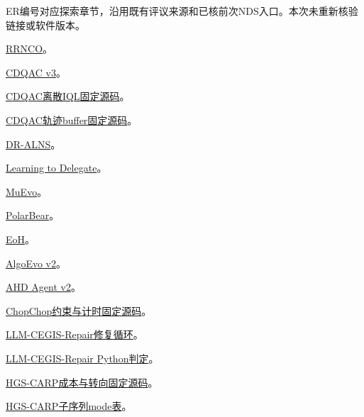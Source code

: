 \documentclass[11pt,a4paper]{article}
\newcommand{\bodytext}[1]{#1\par}
\newcommand{\referencetext}[1]{{\fontsize{9.4}{14.2}\selectfont#1\par}}
\begin{document}
\bodytext{ER编号对应探索章节，沿用既有评议来源和已核前次NDS入口。本次未重新核验链接或软件版本。}
\referencetext{[ER01] \href{https://arxiv.org/html/2503.16159v1}{RRNCO}。}
\referencetext{[ER02] \href{https://arxiv.org/html/2509.10303v3}{CDQAC v3}。}
\referencetext{[ER03] \href{https://github.com/jesserem/CDQAC\_scheduling/blob/aca0896aae7b715606b8f47e870e4489e50ebf5c/cdqac/methods/iql.py}{CDQAC离散IQL固定源码}。}
\referencetext{[ER04] \href{https://github.com/jesserem/CDQAC\_scheduling/blob/aca0896aae7b715606b8f47e870e4489e50ebf5c/cdqac/buffer/buffer.py\#L138-L173}{CDQAC轨迹buffer固定源码}。}
\referencetext{[ER05] \href{https://arxiv.org/abs/2211.00759}{DR-ALNS}。}
\referencetext{[ER06] \href{https://papers.neurips.cc/paper\_files/paper/2021/hash/dc9fa5f217a1e57b8a6adeb065560b38-Abstract.html}{Learning to Delegate}。}
\referencetext{[ER07] \href{https://arxiv.org/html/2608.03636v1}{MuEvo}。}
\referencetext{[ER08] \href{https://arxiv.org/html/2603.08493v1}{PolarBear}。}
\referencetext{[ER09] \href{https://proceedings.mlr.press/v235/liu24bs.html}{EoH}。}
\referencetext{[ER10] \href{https://arxiv.org/html/2609.15820v2}{AlgoEvo v2}。}
\referencetext{[ER11] \href{https://arxiv.org/html/2605.08756v2}{AHD Agent v2}。}
\referencetext{[ER12] \href{https://github.com/large-loris-models/chopchop/blob/681083a6fd921ac9cbaf984db628cf92eb019a3f/llm/run\_llm.py}{ChopChop约束与计时固定源码}。}
\referencetext{[ER13] \href{https://github.com/pmorvalho/LLM-CEGIS-Repair/blob/7fe749b16a7a1367f2a519492a5d8689af06a896/repair.py}{LLM-CEGIS-Repair修复循环}。}
\referencetext{[ER14] \href{https://github.com/pmorvalho/LLM-CEGIS-Repair/blob/7fe749b16a7a1367f2a519492a5d8689af06a896/mentor/interpreter.py}{LLM-CEGIS-Repair Python判定}。}
\referencetext{[ER15] \href{https://github.com/vidalt/HGS-CARP/blob/08fde6a5672c3814dca1b4450aa9e5968b1d273a/Program/Params.cpp\#L1041-L1097}{HGS-CARP成本与转向固定源码}。}
\referencetext{[ER16] \href{https://github.com/vidalt/HGS-CARP/blob/08fde6a5672c3814dca1b4450aa9e5968b1d273a/Program/SeqData.cpp\#L514-L538}{HGS-CARP子序列mode表}。}
\end{document}
